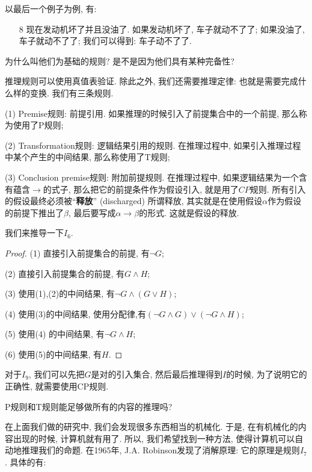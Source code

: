 以最后一个例子为例, 有: 

\begin{example}
	\begin{itemize}
		\item[8] 现在发动机坏了并且没油了. 如果发动机坏了, 车子就动不了了; 如果没油了, 车子就动不了了; 我们可以得到: 车子动不了了. 
	\end{itemize}
\end{example}

\begin{bonus}
	为什么叫他们为基础的规则? 是不是因为他们具有某种完备性? 
\end{bonus}


推理规则可以使用真值表验证. 除此之外, 我们还需要推理定律: 也就是需要完成什么样的变换. 我们有三条规则.


(1) Premise规则: 前提引用. 如果推理的时候引入了前提集合中的一个前提, 那么称为使用了P规则;

(2) Transformation规则: 逻辑结果引用的规则. 在推理过程中, 如果引入推理过程中某个产生的中间结果, 那么称使用了T规则;

(3) Conclusion premise规则: 附加前提规则. 在推理过程中, 如果逻辑结果为一个含有蕴含$\rightarrow$的式子, 那么把它的前提条件作为假设引入, 就是用了$CP$规则. 所有引入的假设最终必须被``{\bf 释放}'' (discharged)
    所谓释放, 其实就是在使用假设$\alpha$作为假设的前提下推出了$\beta$, 最后要写成$\alpha \rightarrow \beta$的形式. 这就是假设的释放. 

我们来推导一下$I_6$. 

\begin{proof}
	(1) 直接引入前提集合的前提, 有$\lnot G$;
	
	(2) 直接引入前提集合的前提, 有$G \land H$;
	
	(3) 使用(1),(2)的中间结果, 有$\lnot G \land (G\lor H)$;
	
	(4) 使用(3)的中间结果, 使用分配律,有$(\lnot G \land G)\lor (\lnot G \land H)$;
	
	(5) 使用(4) 的中间结果, 有$\lnot G \land H$;
	
	(6) 使用(5)的中间结果, 有$H$. 
\end{proof}

对于$I_9$, 我们可以先把$G$是对的引入集合, 然后最后推理得到$I$的时候, 为了说明它的正确性, 就需要使用CP规则. 

\begin{bonus}
	P规则和T规则能足够做所有的内容的推理吗?
\end{bonus}

在上面我们做的研究中, 我们会发现很多东西相当的机械化. 于是, 在有机械化的内容出现的时候, 计算机就有用了. 所以, 我们希望找到一种方法, 使得计算机可以自动地推理我们的命题. 在1965年, J.A. Robinson发现了消解原理: 它的原理是规则$I_7$. 具体的有: 

